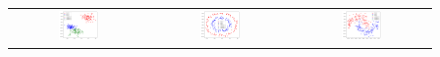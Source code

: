 \documentclass[12pt, a4paper,  nobibnotes]{article}
\begin{document}
\newcommand{\thisfigurewidth}{0.31}
\begin{figure}[H]
    \centering
    \begin{tabular}{ccc}
      \includegraphics[width=\thisfigurewidth\textwidth]{figures/fig_dataset_blobs.png} & 
      \includegraphics[width=\thisfigurewidth\textwidth]{figures/fig_dataset_circles.png} &
      \includegraphics[width=\thisfigurewidth\textwidth]{figures/fig_dataset_moons.png} \\

\end{tabular}
\end{figure}
\end{document}
